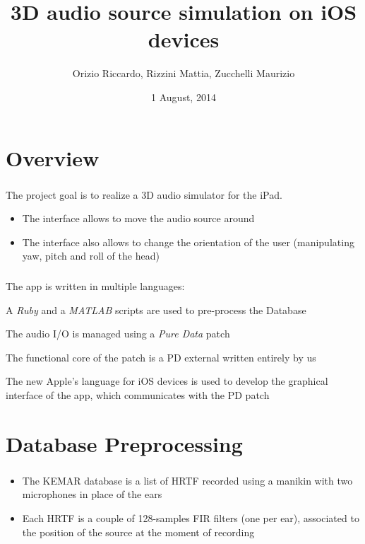 \documentclass{beamer}
\title{3D audio source simulation on iOS devices}
\author[Orizio, Rizzini, Zucchelli]{Orizio Riccardo, Rizzini Mattia, Zucchelli Maurizio}
\date{1 August, 2014}
\institute[UniBS]{University of Brescia}
\begin{document}
	\begin{frame}
		\maketitle
	\end{frame}

	\section{Overview}
	
	\begin{frame}
		\frametitle{\insertsection}
		The project goal is to realize a 3D audio simulator for the iPad.
		\begin{itemize}
			\item The interface allows to move the audio source around
			\item The interface also allows to change the orientation of the user (manipulating yaw,
				pitch and roll of the head)
		\end{itemize}
	\end{frame}

	\begin{frame}
		\frametitle{\insertsection}
		The app is written in multiple languages:
		\begin{description}[leftmargin=1em]
			\item[Ruby, MATLAB] A {\em Ruby} and a {\em MATLAB} scripts are
				used to pre-process the Database
			\item[Pure Data] The audio I/O is managed using a {\em Pure Data} patch
			\item[C++] The functional core of the patch is a PD external written entirely
				by us
			\item[Swift] The new Apple's language for iOS devices is used to develop the
				graphical interface of the app, which communicates with the PD patch
		\end{description}
	\end{frame}

	\AtBeginSection[]
	{
		\begin{frame}
			\frametitle{Outline}
			\tableofcontents[currentsection]
		\end{frame}
	}

	\section{Database Preprocessing}

	\begin{frame}
		\frametitle{\insertsection}
		\begin{itemize}
			\item The \textsc{KEMAR} database is a list of \textsc{HRTF} recorded using a manikin with two
				microphones in place of the ears
			\item Each \textsc{HRTF} is a couple of 128-samples FIR filters (one per ear), associated to the position
				of the source at the moment of recording
		\end{itemize}
	\end{frame}
\end{document}
